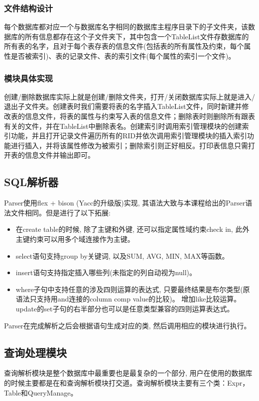 \documentclass[11pt,UTF8]{report}
\begin{document}
\subsubsection{文件结构设计}

每个数据库都对应一个与数据库名字相同的数据库主程序目录下的子文件夹，该数据库的所有信息都存在这个子文件夹下，其中包含一个TableList文件存数据库的所有表的名字，且对于每个表存表的信息文件(包括表的所有属性及约束，每个属性是否被索引)、表的记录文件、表的索引文件(每个属性的索引一个文件)。
\subsubsection{模块具体实现}

创建/删除数据库实际上就是创建/删除文件夹，打开/关闭数据库实际上就是进入/退出子文件夹。创建表时我们需要将表的名字插入TableList文件，同时新建并修改表的信息文件，将表的属性与约束写入表的信息文件；删除表时则删除所有跟表有关的文件，并在TableList中删除表名。创建索引时调用索引管理模块的创建索引功能，并且打开记录文件遍历所有的RID并依次调用索引管理模块的插入索引功能进行插入，并将该属性修改为被索引；删除索引则正好相反。打印表信息只需打开表的信息文件并输出即可。
\subsection{SQL解析器}
Parser使用flex + bison (Yacc的升级版)实现, 其语法大致与本课程给出的Parser语法文件相同。但是进行了以下拓展:
\begin{itemize}
	\item 在create table的时候, 除了主键和外键, 还可以指定属性域约束check in, 此外主键约束可以用多个域连接作为主键。
	\item select语句支持group by关键词, 以及SUM, AVG, MIN, MAX等函数。
	\item insert语句支持指定插入哪些列(未指定的列自动视为null)。
	\item where子句中支持任意的涉及四则运算的表达式, 只要最终结果是布尔类型(原语法只支持用and连接的column comp value的比较)。 增加like比较运算。 update的set子句的右半部分也可以是任意类型兼容的四则运算表达式。
\end{itemize}

Parser在完成解析之后会根据语句生成对应的类, 然后调用相应的模块进行执行。

\subsection{查询处理模块}
查询解析模块是整个数据库中最重要也是最复杂的一个部分, 用户在使用的数据库的时候主要都是在和查询解析模块打交道。查询解析模块主要有三个类：Expr，Table和QueryManage。
\end{document}
